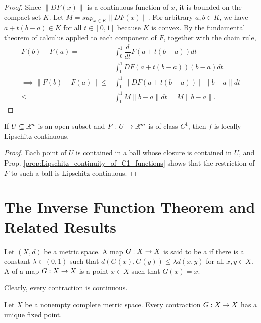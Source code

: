 \documentclass[11pt,a4paper]{article}
\begin{document}
\begin{proof}
Since $\|DF(x)\|$ is a continuous function of $x$, it is bounded on the compact set $K$. Let $M = sup_{x\in K}\|DF(x)\|$. For arbitrary $a,b\in K$, we have $a+t(b-a)\in K$ for all $t\in [0,1]$ because $K$ is convex. By the fundamental theorem of calculus applied to each component of $F$, together with the chain rule,
\begin{align*}
F(b) - F(a) =& \int_0^1 \dfrac{d}{dt} F(a+t(b-a)) dt \\
=& \int_0^1 DF(a+t(b-a)) (b-a)dt. \\
\implies \|F(b)-F(a)\| \le& \int_0^1 \|DF(a+t(b-a))\| \|b-a\| dt \\
\le& \int_0^1 M\|b-a\| dt = M\|b-a\|.
\end{align*}
\end{proof}

\begin{corollary}
If $U\subseteq \mathbb{R}^n$ is an open subset and $F:U\rightarrow \mathbb{R}^m$ is of class $C^1$, then $f$ is locally Lipschitz continuous.
\end{corollary}

\begin{proof}
Each point of $U$ is contained in a ball whose closure is contained in $U$, and Prop. \ref{prop:Lipschitz_continuity_of_C1_functions} shows that the restriction of $F$ to such a ball is Lipschitz continuous.
\end{proof}

\section{The Inverse Function Theorem and Related Results}

\begin{definition}
Let $(X,d)$ be a metric space. A map $G:X\rightarrow X$ is said to be a  if there is a constant $\lambda\in (0,1)$ such that $d(G(x),G(y))\le \lambda d(x,y)$ for all $x,y\in X$. A  of a map $G:X\rightarrow X$ is a point $x\in X$ such that $G(x) = x$.
\end{definition}

\begin{remark}
Clearly, every contraction is continuous.
\end{remark}

\begin{proposition}
Let $X$ be a nonempty complete metric space. Every contraction $G:X\rightarrow X$ has a unique fixed point.
\end{proposition}
\end{document}
